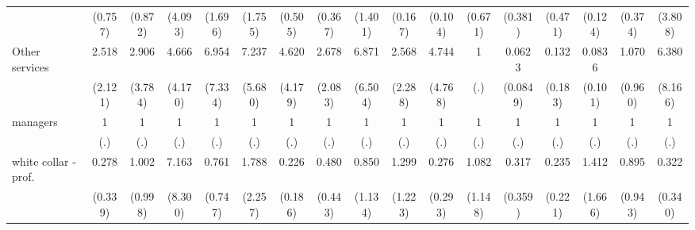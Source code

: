 {\begin{tabular}{l*{16}{c}}
                    &     (0.757)         &     (0.872)         &     (4.093)         &     (1.696)         &     (1.755)         &     (0.505)         &     (0.367)         &     (1.401)         &     (0.167)         &     (0.104)         &     (0.671)         &     (0.381)         &     (0.471)         &     (0.124)         &     (0.374)         &     (3.808)         \\
[1em]
Other services      &       2.518         &       2.906         &       4.666         &       6.954         &       7.237\sym{*}  &       4.620         &       2.678         &       6.871\sym{*}  &       2.568         &       4.744         &           1         &      0.0623\sym{*}  &       0.132         &      0.0836\sym{*}  &       1.070         &       6.380         \\
                    &     (2.121)         &     (3.784)         &     (4.170)         &     (7.334)         &     (5.680)         &     (4.179)         &     (2.083)         &     (6.504)         &     (2.288)         &     (4.768)         &         (.)         &    (0.0849)         &     (0.183)         &     (0.101)         &     (0.960)         &     (8.166)         \\
[1em]
managers            &           1         &           1         &           1         &           1         &           1         &           1         &           1         &           1         &           1         &           1         &           1         &           1         &           1         &           1         &           1         &           1         \\
                    &         (.)         &         (.)         &         (.)         &         (.)         &         (.)         &         (.)         &         (.)         &         (.)         &         (.)         &         (.)         &         (.)         &         (.)         &         (.)         &         (.)         &         (.)         &         (.)         \\
[1em]
white collar - prof.&       0.278         &       1.002         &       7.163         &       0.761         &       1.788         &       0.226         &       0.480         &       0.850         &       1.299         &       0.276         &       1.082         &       0.317         &       0.235         &       1.412         &       0.895         &       0.322         \\
                    &     (0.339)         &     (0.998)         &     (8.300)         &     (0.747)         &     (2.257)         &     (0.186)         &     (0.443)         &     (1.134)         &     (1.223)         &     (0.293)         &     (1.148)         &     (0.359)         &     (0.221)         &     (1.666)         &     (0.943)         &     (0.340)         \\

\end{tabular}}
